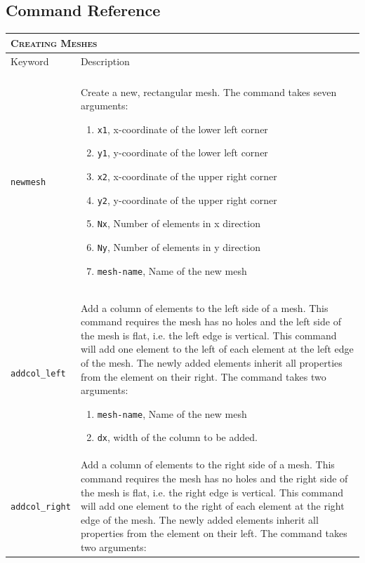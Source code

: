 \documentclass[noshowpacs,preprintnumbers,amsmath,amssymb, letter]{revtex4}
\begin{document}
\subsection{\label{commref}Command Reference}
\begin{longtable}{p{}p{}}
\multicolumn{2}{l}{\textsc{Creating Meshes}} \\*
\hline
Keyword & Description \\
\hline\\
\texttt{newmesh} 	& Create a new, rectangular mesh. The command takes seven arguments:
\begin{enumerate}
\item \texttt{x1}, x-coordinate of the lower left corner
\item \texttt{y1}, y-coordinate of the lower left corner
\item \texttt{x2}, x-coordinate of the upper right corner
\item \texttt{y2}, y-coordinate of the upper right corner
\item \texttt{Nx}, Number of elements in x direction
\item \texttt{Ny}, Number of elements in y direction
\item \texttt{mesh-name}, Name of the new mesh
\end{enumerate}\\
\texttt{addcol\_left} 	& Add a column of elements to the left side of a mesh. This command requires the mesh has no holes and the left side of the mesh is flat, i.e. the left edge is vertical. This command will add one element to the left of each element at the left edge of the mesh. The newly added elements inherit all properties from the element on their right. The command takes two arguments:
\begin{enumerate}
\item \texttt{mesh-name}, Name of the new mesh
\item \texttt{dx}, width of the column to be added. 
\end{enumerate}\\
\texttt{addcol\_right} 	& Add a column of elements to the right side of a mesh. This command requires the mesh has no holes and the right side of the mesh is flat, i.e. the right edge is vertical. This command will add one element to the right of each element at the right edge of the mesh. The newly added elements inherit all properties from the element on their left. The command takes two arguments:

\end{longtable}
\end{document}
